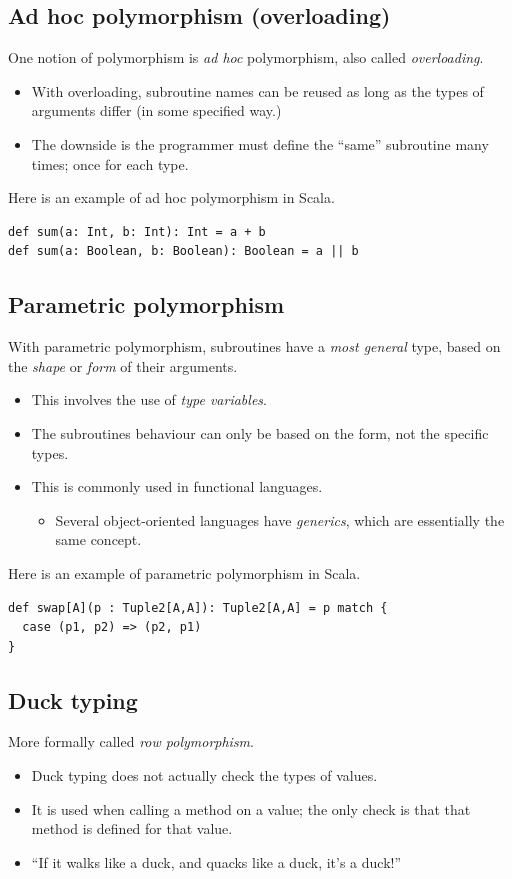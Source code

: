 \documentclass[11pt]{article}
\theoremstyle{definition}
\begin{document}
\subsection{Ad hoc polymorphism (overloading)}
\label{sec:org5734ee9}
One notion of polymorphism is \emph{ad hoc} polymorphism,
also called \emph{overloading}.
\begin{itemize}
\item With overloading, subroutine names
can be reused as long as the types of arguments
differ (in some specified way.)
\item The downside is the programmer must define
the “same” subroutine many times; once for each type.
\end{itemize}

Here is an example of ad hoc polymorphism in Scala.
\begin{verbatim}
def sum(a: Int, b: Int): Int = a + b
def sum(a: Boolean, b: Boolean): Boolean = a || b
\end{verbatim}

\subsection{Parametric polymorphism}
\label{sec:orgace2543}
With parametric polymorphism, subroutines have a
\emph{most general} type, based on the \emph{shape} or \emph{form} of their arguments.
\begin{itemize}
\item This involves the use of \emph{type variables}.
\item The subroutines behaviour can only be based on the form,
not the specific types.
\item This is commonly used in functional languages.
\begin{itemize}
\item Several object-oriented languages have \emph{generics}, which are
essentially the same concept.
\end{itemize}
\end{itemize}

Here is an example of parametric polymorphism in Scala.
\begin{verbatim}
def swap[A](p : Tuple2[A,A]): Tuple2[A,A] = p match {
  case (p1, p2) => (p2, p1)
}
\end{verbatim}

\subsection{Duck typing}
\label{sec:org88d7e6a}
More formally called \emph{row polymorphism}.
\begin{itemize}
\item Duck typing does not actually check the types of values.
\item It is used when calling a method on a value;
the only check is that that method is defined for that value.
\item “If it walks like a duck, and quacks like a duck, it's a duck!”
\end{itemize}
\end{document}
